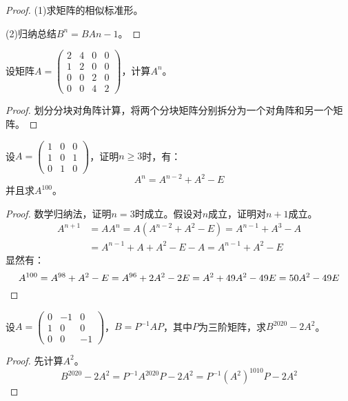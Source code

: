 \begin{proof}
	(1)求矩阵的相似标准形。\par
	(2)归纳总结$B^n=BA{n-1}$。
\end{proof}
\begin{theorem}
	设矩阵$A=
	\begin{pmatrix}
		2 & 4 & 0 & 0 \\
		1 & 2 & 0 & 0 \\
		0 & 0 & 2 & 0 \\
		0 & 0 & 4 & 2 
	\end{pmatrix}$，计算$A^n$。
\end{theorem}
\begin{proof}
	划分分块对角阵计算，将两个分块矩阵分别拆分为一个对角阵和另一个矩阵。
\end{proof}
\begin{theorem}
	设$A=
	\begin{pmatrix}
		1 & 0 & 0 \\
		1 & 0 & 1 \\
		0 & 1 & 0
	\end{pmatrix}$，证明$n\geqslant3$时，有：
	\begin{equation*}
		A^n=A^{n-2}+A^2-E
	\end{equation*}
	并且求$A^{100}$。
\end{theorem}
\begin{proof}
	数学归纳法，证明$n=3$时成立。假设对$n$成立，证明对$n+1$成立。
	\begin{align*}
		A^{n+1}&=AA^n=A(A^{n-2}+A^2-E)=A^{n-1}+A^3-A \\
		&=A^{n-1}+A+A^2-E-A=A^{n-1}+A^2-E
	\end{align*}
	显然有：
	\begin{equation*}
		A^{100}=A^{98}+A^2-E=A^{96}+2A^2-2E=A^2+49A^2-49E=50A^2-49E\qedhere
	\end{equation*}
\end{proof}
\begin{theorem}
	设$A=\begin{pmatrix}
		0 & -1 & 0 \\
		1 & 0 & 0 \\
		0 & 0 & -1
	\end{pmatrix}$，$B=P^{-1}AP$，其中$P$为三阶矩阵，求$B^{2020}-2A^2$。
\end{theorem}
\begin{proof}
	先计算$A^2$。
	\begin{equation*}
		B^{2020}-2A^2=P^{-1}A^{2020}P-2A^2=P^{-1}(A^2)^{1010}P-2A^2
	\end{equation*}
\end{proof}

